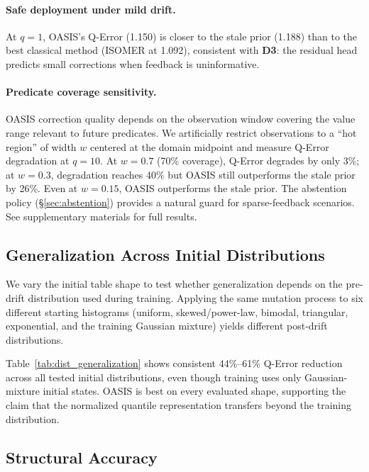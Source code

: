 \documentclass[runningheads]{llncs}
\begin{document}
\paragraph{Safe deployment under mild drift.}
At $q{=}1$, OASIS's Q-Error (1.150) is closer to the stale prior (1.188) than to the best classical method (ISOMER at 1.092), consistent with \textbf{D3}: the residual head predicts small corrections when feedback is uninformative.

\paragraph{Predicate coverage sensitivity.}
OASIS correction quality depends on the observation window covering the value range relevant to future predicates. We artificially restrict observations to a ``hot region'' of width $w$ centered at the domain midpoint and measure Q-Error degradation at $q{=}10$. At $w{=}0.7$ (70\% coverage), Q-Error degrades by only 3\%; at $w{=}0.3$, degradation reaches 40\% but OASIS still outperforms the stale prior by 26\%. Even at $w{=}0.15$, OASIS outperforms the stale prior. The abstention policy (\S\ref{sec:abstention}) provides a natural guard for sparse-feedback scenarios. See supplementary materials for full results.

\subsection{Generalization Across Initial Distributions}
\label{sec:dist_generalization}

We vary the initial table shape to test whether generalization depends on the pre-drift distribution used during training. Applying the same mutation process to six different starting histograms (uniform, skewed/power-law, bimodal, triangular, exponential, and the training Gaussian mixture) yields different post-drift distributions.



Table~\ref{tab:dist_generalization} shows consistent 44\%--61\% Q-Error reduction across all tested initial distributions, even though training uses only Gaussian-mixture initial states. OASIS is best on every evaluated shape, supporting the claim that the normalized quantile representation transfers beyond the training distribution.

\subsection{Structural Accuracy}
\label{sec:secondary}
\end{document}
